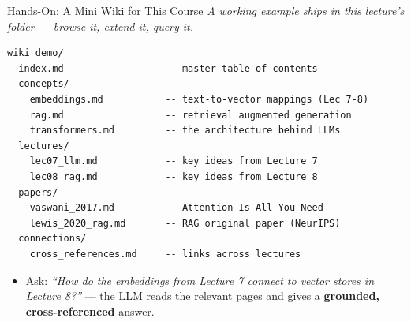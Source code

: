 \begin{frame}[fragile]{Hands-On: A Mini Wiki for This Course}
\textit{\footnotesize A working example ships in this lecture's folder --- browse it, extend it, query it.}

\begin{lstlisting}[basicstyle=\ttfamily\footnotesize]
wiki_demo/
  index.md                  -- master table of contents
  concepts/
    embeddings.md           -- text-to-vector mappings (Lec 7-8)
    rag.md                  -- retrieval augmented generation
    transformers.md         -- the architecture behind LLMs
  lectures/
    lec07_llm.md            -- key ideas from Lecture 7
    lec08_rag.md            -- key ideas from Lecture 8
  papers/
    vaswani_2017.md         -- Attention Is All You Need
    lewis_2020_rag.md       -- RAG original paper (NeurIPS)
  connections/
    cross_references.md     -- links across lectures
\end{lstlisting}

\smallskip
\begin{itemize}
\item Ask: \emph{``How do the embeddings from Lecture 7 connect to vector stores in Lecture 8?''} --- the LLM reads the relevant pages and gives a \textbf{grounded, cross-referenced} answer.
\end{itemize}
\end{frame}

